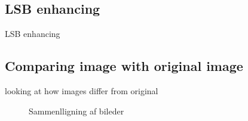 \subsection{LSB enhancing}
\begin{frame}{LSB enhancing}
\end{frame}

\subsection{Comparing image with original image}
\begin{frame}{looking at how images differ from original}
\begin{figure}
\centering
{}
\caption{Sammenlligning af bileder}
\end{figure}
\end{frame}